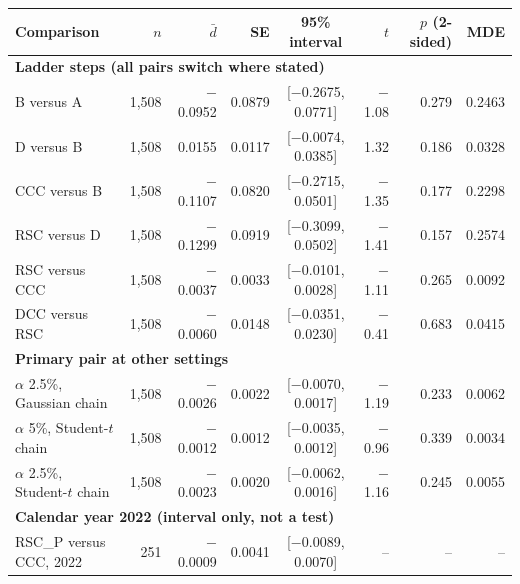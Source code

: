 \begin{table}[t]
\centering{}\scriptsize\setlength{\tabcolsep}{5pt}
\caption{}\label{tab:holdout-secondary}
\begin{tabular}{lrrrcrrr}
\toprule
Comparison & $n$ & $\bar d$ & SE & 95\% interval & $t$ & $p$ (2-sided) & MDE \\
\midrule
\multicolumn{8}{l}{\textbf{Ladder steps (all pairs switch where stated)}}\\
B versus A & 1,508 & $-$0.0952 & 0.0879 & [$-$0.2675, 0.0771] & $-$1.08 & 0.279 & 0.2463 \\
D versus B & 1,508 & 0.0155 & 0.0117 & [$-$0.0074, 0.0385] & 1.32 & 0.186 & 0.0328 \\
CCC versus B & 1,508 & $-$0.1107 & 0.0820 & [$-$0.2715, 0.0501] & $-$1.35 & 0.177 & 0.2298 \\
RSC versus D & 1,508 & $-$0.1299 & 0.0919 & [$-$0.3099, 0.0502] & $-$1.41 & 0.157 & 0.2574 \\
RSC versus CCC & 1,508 & $-$0.0037 & 0.0033 & [$-$0.0101, 0.0028] & $-$1.11 & 0.265 & 0.0092 \\
DCC versus RSC & 1,508 & $-$0.0060 & 0.0148 & [$-$0.0351, 0.0230] & $-$0.41 & 0.683 & 0.0415 \\
\midrule
\multicolumn{8}{l}{\textbf{Primary pair at other settings}}\\
$\alpha$ 2.5\%, Gaussian chain & 1,508 & $-$0.0026 & 0.0022 & [$-$0.0070, 0.0017] & $-$1.19 & 0.233 & 0.0062 \\
$\alpha$ 5\%, Student-$t$ chain & 1,508 & $-$0.0012 & 0.0012 & [$-$0.0035, 0.0012] & $-$0.96 & 0.339 & 0.0034 \\
$\alpha$ 2.5\%, Student-$t$ chain & 1,508 & $-$0.0023 & 0.0020 & [$-$0.0062, 0.0016] & $-$1.16 & 0.245 & 0.0055 \\
\midrule
\multicolumn{8}{l}{\textbf{Calendar year 2022 (interval only, not a test)}}\\
RSC\_P versus CCC, 2022 & 251 & $-$0.0009 & 0.0041 & [$-$0.0089, 0.0070] & -- & -- & -- \\
\bottomrule
\end{tabular}
\end{table}
